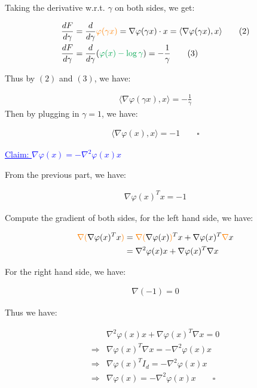 \documentclass{article}
\begin{document}
Taking the derivative w.r.t. $\gamma$ on both sides, we get:

\begin{align*}
    \frac{dF}{d\gamma} &= \frac{d}{d\gamma} \textcolor{orange}{\varphi (\gamma x)} = \nabla \varphi (\gamma x) \cdot x = \langle \nabla \varphi (\gamma x), x \rangle \tag{2}\\
    \frac{dF}{d\gamma} &= \frac{d}{d\gamma} (\textcolor{Green}{\varphi (x) - \log \gamma}) = - \frac{1}{\gamma} \tag{3}
\end{align*}

Thus by $(2)$ and $(3)$, we have:

\begin{align*}
    \langle \nabla \varphi (\gamma x), x \rangle = - \frac{1}{\gamma}
\end{align*}
Then by plugging in $\gamma = 1$, we have:

\begin{align*}
    \langle \nabla \varphi (x), x \rangle = - 1 \qquad \square
\end{align*}

\textcolor{blue}{\underline{Claim: $\nabla \varphi (x) = - \nabla^2 \varphi ( x ) x$ } }
\bigskip

From the previous part, we have:

\begin{align*}
    \nabla \varphi (x)^T x = - 1
\end{align*}

Compute the gradient of both sides, for the left hand side, we have:

\begin{align*}
    \textcolor{orange}{\nabla(}\nabla \varphi (x)^T x\textcolor{orange}{)}
    &= \textcolor{orange}{\nabla (}\nabla \varphi (x)\textcolor{orange}{)}^T x + \nabla \varphi (x)^T \textcolor{orange}{\nabla} x  \\
    &= \nabla^2 \varphi (x) x + \nabla \varphi (x)^T \nabla x  \\
\end{align*}

For the right hand side, we have:

\begin{align*}
    \nabla (- 1) = 0
\end{align*}

Thus we have:

\begin{align*}
    &\nabla^2 \varphi (x) x + \nabla \varphi (x)^T \nabla x = 0 \\
    \Rightarrow &\nabla \varphi (x)^T \nabla x = - \nabla^2 \varphi (x) x \\
    \Rightarrow &\nabla \varphi (x)^T I_d = - \nabla^2 \varphi (x) x \\
    \Rightarrow &\nabla \varphi (x) = - \nabla^2 \varphi (x) x \qquad \square
\end{align*}
\end{document}

